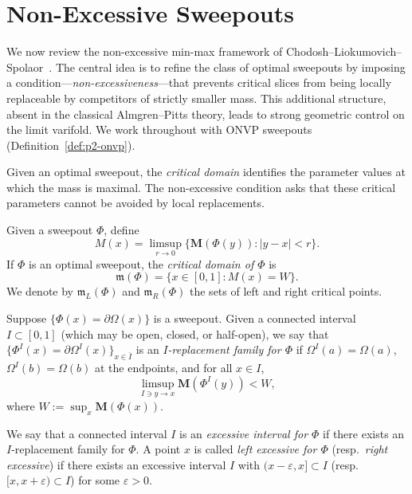
\section{Non-Excessive Sweepouts}\label{sec:non-excessive-prelim}

We now review the non-excessive min-max framework of Chodosh--Liokumovich--Spolaor~\cite{CLS22}. The central idea is to refine the class of optimal sweepouts by imposing a condition---\emph{non-excessiveness}---that prevents critical slices from being locally replaceable by competitors of strictly smaller mass. This additional structure, absent in the classical Almgren--Pitts theory, leads to strong geometric control on the limit varifold. We work throughout with ONVP sweepouts (Definition~\ref{def:p2-onvp}).

Given an optimal sweepout, the \emph{critical domain} identifies the parameter values at which the mass is maximal. The non-excessive condition asks that these critical parameters cannot be avoided by local replacements.

\begin{definition}\label{def:critical-set}
Given a sweepout $\Phi$, define
\[
M(x) = \limsup_{r \to 0} \{\mathbf{M}(\Phi(y)): |y-x| < r\}.
\]
If $\Phi$ is an optimal sweepout, the \emph{critical domain of $\Phi$} is
\[
\mathfrak{m}(\Phi)=\{ x \in [0,1]: M(x) =W \}.
\]
We denote by $\mathfrak{m}_L(\Phi)$ and $\mathfrak{m}_R(\Phi)$ the sets of left and right critical points.
\end{definition}

\begin{definition}\label{def:excessive-interval}
Suppose $\{\Phi(x) = \partial\Omega(x)\}$ is a sweepout. Given a connected interval $I \subset [0,1]$
(which may be open, closed, or half-open), we say that $\{\Phi^I(x) = \partial\Omega^I(x)\}_{x\in \bar{I}}$
is an \emph{$I$-replacement family for $\Phi$} if
$\Omega^I(a) = \Omega(a)$, $\Omega^I(b) = \Omega(b)$ at the endpoints, and for all $x \in I$,
\[
\limsup_{I \ni y \to x} \mathbf{M}(\Phi^I(y)) < W,
\]
where $W := \sup_x \mathbf{M}(\Phi(x))$.

We say that a connected interval $I$ is an \emph{excessive interval for $\Phi$} if there exists an $I$-replacement family
for $\Phi$. A point $x$ is called \emph{left excessive for $\Phi$} (resp.\ \emph{right excessive}) if there exists an excessive interval $I$ with
$(x-\varepsilon, x] \subset I$ (resp.\ $[x, x+\varepsilon) \subset I$) for some $\varepsilon > 0$.
\end{definition}

